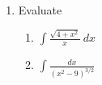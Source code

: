 \documentclass[11pt,fleqn]{article}
\begin{document}
\begin{enumerate}
\item Evaluate 
	\begin{enumerate}
	\item $\displaystyle{\int \frac{\sqrt{4+x^2}}{x} \: dx }$
	\vfill
	\item $\displaystyle{\int \frac{dx}{(x^2-9)^{3/2}}}$
	\vfill
	\end{enumerate}
	


\end{enumerate}
\end{document}
